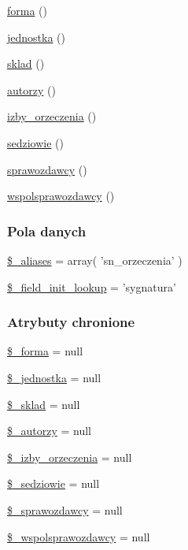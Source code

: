 \begin{DoxyCompactItemize}
\item 
\hyperlink{classep___s_n___orzeczenie_a608fa64fd97142801ced83ea87121df2}{forma} ()
\item 
\hyperlink{classep___s_n___orzeczenie_a9770abfccd8d758bc47ff823619f4322}{jednostka} ()
\item 
\hyperlink{classep___s_n___orzeczenie_a6b9228e10a1bc1f8a597116e902d231d}{sklad} ()
\item 
\hyperlink{classep___s_n___orzeczenie_ac66efa4209f50d765772be02a881381e}{autorzy} ()
\item 
\hyperlink{classep___s_n___orzeczenie_a5f63a0d971299ec2faf962f75055dd16}{izby\-\_\-orzeczenia} ()
\item 
\hyperlink{classep___s_n___orzeczenie_a8a15d60da65e02bae2cbdbf37b916e9f}{sedziowie} ()
\item 
\hyperlink{classep___s_n___orzeczenie_a76d3ecd15358754b888e8224f0bb525d}{sprawozdawcy} ()
\item 
\hyperlink{classep___s_n___orzeczenie_a6c6f87dc07e219e95c13638d943a60eb}{wspolsprawozdawcy} ()
\end{DoxyCompactItemize}
\subsubsection*{Pola danych}
\begin{DoxyCompactItemize}
\item 
\hyperlink{classep___s_n___orzeczenie_ab4e31d75f0bc5d512456911e5d01366b}{\$\-\_\-aliases} = array( 'sn\-\_\-orzeczenia' )
\item 
\hyperlink{classep___s_n___orzeczenie_a4a4d54ae35428077a7c61ec8a5139af3}{\$\-\_\-field\-\_\-init\-\_\-lookup} = 'sygnatura'
\end{DoxyCompactItemize}
\subsubsection*{Atrybuty chronione}
\begin{DoxyCompactItemize}
\item 
\hyperlink{classep___s_n___orzeczenie_a95b4aef311558b8233d9934bd08406ec}{\$\-\_\-forma} = null
\item 
\hyperlink{classep___s_n___orzeczenie_ad1b42e8f431ce2f82d2ccf9395587947}{\$\-\_\-jednostka} = null
\item 
\hyperlink{classep___s_n___orzeczenie_aeeba512286131af36395e8e6bddafbac}{\$\-\_\-sklad} = null
\item 
\hyperlink{classep___s_n___orzeczenie_a979f172256d5c0c7e9a858abeddcfc18}{\$\-\_\-autorzy} = null
\item 
\hyperlink{classep___s_n___orzeczenie_a32e61795984a518ce9fe14cbd1a68306}{\$\-\_\-izby\-\_\-orzeczenia} = null
\item 
\hyperlink{classep___s_n___orzeczenie_a9515f25f368eef1b6825d9568f40c4bc}{\$\-\_\-sedziowie} = null
\item 
\hyperlink{classep___s_n___orzeczenie_a714759738f329fda5eebaffc97a6be38}{\$\-\_\-sprawozdawcy} = null
\item 
\hyperlink{classep___s_n___orzeczenie_ad912d3fe15f8233d48bc2a574708cfc2}{\$\-\_\-wspolsprawozdawcy} = null
\end{DoxyCompactItemize}
